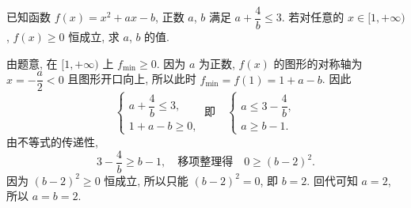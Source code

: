 \begin{example}
    已知函数 $f(x)= x^2+ax-b$, 正数 $a$, $b$ 满足 $a+\dfrac4b\leqslant 3$. 若对任意的 $x\in[1,+\infty)$, $f(x)\geqslant 0$ 恒成立, 求 $a$, $b$ 的值.
\end{example}
\begin{solution}
    由题意, 在 $[1,+\infty)$ 上 $f_{\min}\geqslant 0$. 因为 $a$ 为正数, $f(x)$ 的图形的对称轴为 $x=-\dfrac{a}2<0$ 且图形开口向上, 所以此时 $f_{\min}=f(1)=1+a-b$. 因此
    \[\left\{\!\!\begin{array}{l}
        a+\dfrac4b\leqslant 3,\\
        1+a-b\geqslant 0,
      \end{array}\right.\ \text{即}\quad
      \left\{\!\!\begin{array}{l}
        a\leqslant 3-\dfrac4b,\\
        a\geqslant b-1.
      \end{array}\right.\]
    由不等式的传递性, 
    \[3-\frac4b\geqslant b-1,\quad\text{移项整理得}\quad
    0\geqslant (b-2)^2.\]
    因为 $(b-2)^2\geqslant 0$ 恒成立, 所以只能 $(b-2)^2=0$, 即 $b=2$. 回代可知 $a=2$, 所以 $a=b=2$.
\end{solution}